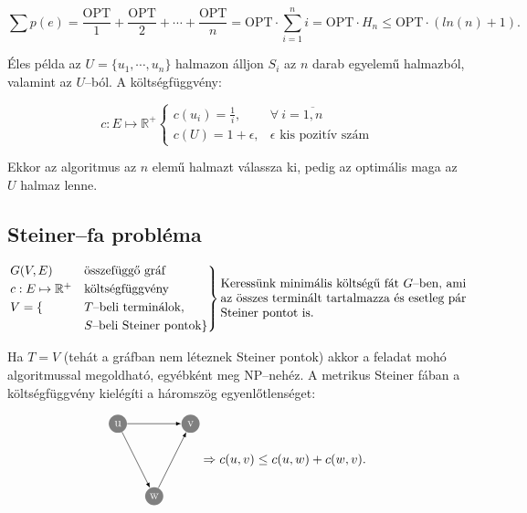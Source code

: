 \[\sum p(e) = \frac{\mbox{OPT}}{1} + \frac{\mbox{OPT}}{2} + \cdots + \frac{\mbox{OPT}}{n}=
	\mbox{OPT} \cdot \sum_{i=1}^n i = \mbox{OPT} \cdot H_n  \leq \mbox{OPT}  \cdot (ln(n)+1). \]

Éles példa az $U=\{ u_1, \cdots, u_n \}$ halmazon álljon $S_i$ az $n$ darab
egyelemű halmazból, valamint az $U$--ból. A költségfüggvény:

\[ c:E \mapsto \mathbb{R}^+ \begin{cases} c({u_i})=\frac{1}{i}, & \forall~
	              i=\overline{1,n}                                          \\
	              c(U)=1 + \epsilon,    & \epsilon \mbox{ kis pozitív szám}\end{cases}\]

Ekkor az algoritmus az $n$ elemű halmazt válassza ki, pedig az optimális maga
az $U$ halmaz lenne.

\subsection{Steiner--fa probléma}

\[
	\begin{rcases}
		G(V,E)                   & \mbox{összefüggő gráf}          \\
		c:E \mapsto \mathbb{R}^+ & \mbox{költségfüggvény}          \\
		V = \{                   & T\mbox{--beli terminálok},      \\
		                         & S\mbox{--beli Steiner pontok}\}
	\end{rcases}
	\parbox[L]{7cm}{ Keressünk minimális költségű fát $G$--ben, ami az összes
	terminált tartalmazza és esetleg pár Steiner pontot is.} \]

Ha $T=V$ (tehát a gráfban nem léteznek Steiner pontok) akkor a feladat mohó
algoritmussal megoldható, egyébként meg NP--nehéz. A metrikus Steiner fában
a költségfüggvény kielégíti a háromszög egyenlőtlenséget:


\[ \parbox[l]{2.5cm}{
		\begin{tikzpicture}[scale=1]
			\tikzset{ p/.style={circle,white,fill=gray,inner sep=0pt,minimum size=0.5cm},
			}
			\node[p] (1) at (0, -3) {w};
			\node[p] (2) at (-1, -1) {u};
			\node[p] (3) at (+1 , -1) {v};

			\draw[-latex] (2) -- (1) node [midway, above] {};
			\draw[-latex] (2) -- (3) node [midway, below] {};
			\draw[-latex] (1) -- (3) node [midway, above] {};
		\end{tikzpicture}} \Rightarrow %
	c(u,v) \leq c(u,w)+c(w,v).
\]

